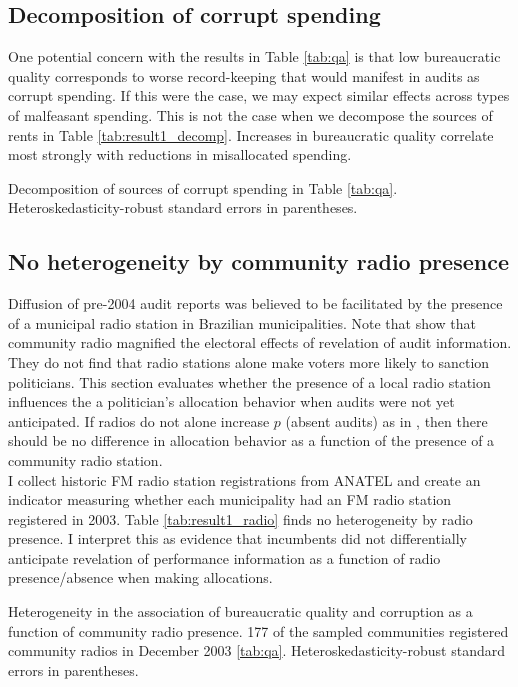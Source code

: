 \documentclass[11pt,english]{article}
\begin{document}
\subsection{Decomposition of corrupt spending}
One potential concern with the results in Table \ref{tab:qa} is that low bureaucratic quality corresponds to worse record-keeping that would manifest in audits as corrupt spending. If this were the case, we may expect similar effects across types of malfeasant spending. This is not the case when we decompose the sources of rents in Table \ref{tab:result1_decomp}. Increases in bureaucratic quality correlate most strongly with reductions in misallocated spending. 
\begin{table}
\resizebox{\textwidth}{!}{
}
\caption{Decomposition of sources of corrupt spending in Table \ref{tab:qa}. Heteroskedasticity-robust standard errors in parentheses.}\label{tab:result1_decomp}
\end{table}

\subsection{No heterogeneity by community radio presence}
Diffusion of pre-2004 audit reports was believed to be facilitated by the presence of a municipal radio station in Brazilian municipalities. Note that \citet{ferrazfinan2008} show that community radio magnified the electoral effects of revelation of audit information. They do not find that radio stations alone make voters more likely to sanction politicians. This section evaluates whether the presence of a local radio station influences the a politician's allocation behavior when audits were not yet anticipated. If radios do not alone increase $p$ (absent audits) as in \citet{ferrazfinan2008}, then there should be no difference in allocation behavior as a function of the presence of a community radio station. \\

I collect historic FM radio station registrations from ANATEL and create an indicator measuring whether each municipality had an FM radio station registered in 2003. Table \ref{tab:result1_radio} finds no heterogeneity by radio presence. I interpret this as evidence that incumbents did not differentially anticipate revelation of performance information as a function of radio presence/absence when making allocations. 
 
\begin{table}
\resizebox{\textwidth}{!}{}
\caption{Heterogeneity in the association of bureaucratic quality and corruption as a function of community radio presence. 177 of the sampled communities registered community radios in December 2003 \ref{tab:qa}. Heteroskedasticity-robust standard errors in parentheses.}\label{tab:result1_radio}
\end{table}
\end{document}

